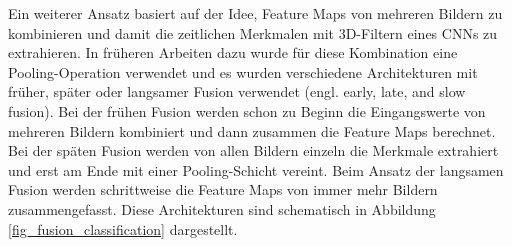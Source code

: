 Ein weiterer Ansatz basiert auf der Idee, Feature Maps von mehreren Bildern zu kombinieren und damit die zeitlichen Merkmalen mit 3D-Filtern eines \acp{CNN} zu extrahieren. In früheren Arbeiten dazu wurde für diese Kombination eine Pooling-Operation verwendet \cite{karpathy2014large, yue2015beyond} und es wurden verschiedene Architekturen mit früher, später oder langsamer Fusion verwendet (engl. early, late, and slow fusion). Bei der frühen Fusion werden schon zu Beginn die Eingangswerte von mehreren Bildern kombiniert und dann zusammen die Feature Maps berechnet. Bei der späten Fusion werden von allen Bildern einzeln die Merkmale extrahiert und erst am Ende mit einer Pooling-Schicht vereint. Beim Ansatz der langsamen Fusion werden schrittweise die Feature Maps von immer mehr Bildern zusammengefasst. Diese Architekturen sind schematisch in Abbildung \ref{fig_fusion_classification} dargestellt.

